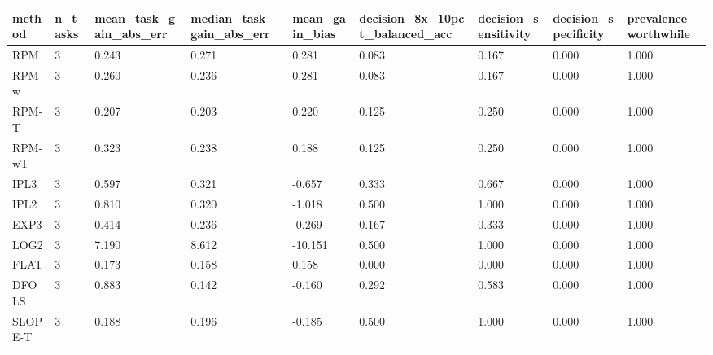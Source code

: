 \begin{tabular}{lllllllll}
\hline
method & n\_tasks & mean\_task\_gain\_abs\_err & median\_task\_gain\_abs\_err & mean\_gain\_bias & decision\_8x\_10pct\_balanced\_acc & decision\_sensitivity & decision\_specificity & prevalence\_worthwhile \\
\hline
RPM & 3 & 0.243 & 0.271 & 0.281 & 0.083 & 0.167 & 0.000 & 1.000 \\
RPM-w & 3 & 0.260 & 0.236 & 0.281 & 0.083 & 0.167 & 0.000 & 1.000 \\
RPM-T & 3 & 0.207 & 0.203 & 0.220 & 0.125 & 0.250 & 0.000 & 1.000 \\
RPM-wT & 3 & 0.323 & 0.238 & 0.188 & 0.125 & 0.250 & 0.000 & 1.000 \\
IPL3 & 3 & 0.597 & 0.321 & -0.657 & 0.333 & 0.667 & 0.000 & 1.000 \\
IPL2 & 3 & 0.810 & 0.320 & -1.018 & 0.500 & 1.000 & 0.000 & 1.000 \\
EXP3 & 3 & 0.414 & 0.236 & -0.269 & 0.167 & 0.333 & 0.000 & 1.000 \\
LOG2 & 3 & 7.190 & 8.612 & -10.151 & 0.500 & 1.000 & 0.000 & 1.000 \\
FLAT & 3 & 0.173 & 0.158 & 0.158 & 0.000 & 0.000 & 0.000 & 1.000 \\
DFOLS & 3 & 0.883 & 0.142 & -0.160 & 0.292 & 0.583 & 0.000 & 1.000 \\
SLOPE-T & 3 & 0.188 & 0.196 & -0.185 & 0.500 & 1.000 & 0.000 & 1.000 \\
\hline
\end{tabular}
